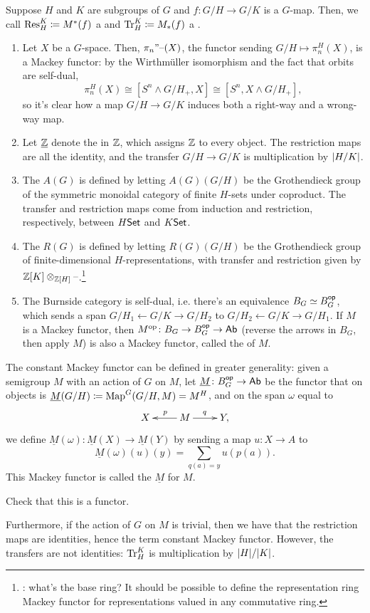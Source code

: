 Suppose $H$ and $K$ are subgroups of $G$ and $f\colon G/H\to G/K$ is a $G$-map. Then, we call $\operatorname{Res}_H^K\coloneqq
M^*(f)$ a  and $\operatorname{Tr}_H^K\coloneqq M_*(f)$ a .
\begin{exm}\hfill
\label{Mackeyexm}
\begin{enumerate}
	\item Let $X$ be a $G$-space. Then, $\pi_n"\text{--}(X)$, the functor sending $G/H\mapsto\pi_n^H(X)$, is a Mackey
	functor: by the Wirthmüller isomorphism and the fact that orbits are self-dual,
	\[\pi_n^H(X)\cong [S^n\wedge G/H_+, X]\cong [S^n, X\wedge G/H_+],\]
	so it's clear how a map $G/H\to G/K$ induces both a right-way and a wrong-way map.
	\item Let $\underline{\mathbb Z}$ denote the  in $\mathbb Z$, which assigns $\mathbb Z$ to every object.
	The restriction maps are all the identity, and the transfer $G/H\to G/K$ is multiplication by $\lvert H/K\rvert$.
	\item The  $A(G)$ is defined by letting $A(G)(G/H)$ be the Grothendieck group of
	the symmetric monoidal category of finite $H$-sets under coproduct. The transfer and restriction maps come from
	induction and restriction, respectively, between $H\mathsf{Set}$ and $K\mathsf{Set}$.
	\item The  $R(G)$ is defined by letting $R(G)(G/H)$ be the Grothendieck
	group of finite-dimensional $H$-representations, with transfer and restriction given by
	$\mathbb Z[K]\otimes_{\mathbb Z[H]}\text{--}$.\footnote{\TODO: what's the base ring? It should be possible to define the
	representation ring Mackey functor for representations valued in any commutative ring.}
	\item The Burnside category is self-dual, i.e. there's an equivalence $B_G\simeq B_G^{\mathsf{op}}$, which sends a span
	$G/H_1\gets G/K\to G/H_2$ to $G/H_2\gets G/K\to G/H_1$. If $M$ is a Mackey functor, then $M^{\mathrm{op}}\colon B_G\to
	B_G^{\mathsf{op}}\to\mathsf{Ab}$ (reverse the arrows in $B_G$, then apply $M$) is also a Mackey functor, called the
	 of $M$.
	\qedhere
\end{enumerate}
\end{exm}
\begin{exm}
The constant Mackey functor can be defined in greater generality: given a semigroup $M$ with an action of $G$ on
$M$, let $\underline M\colon B_G^{\mathsf{op}}\to\mathsf{Ab}$ be the functor that on objects is $\underline M(G/H)\coloneqq
\operatorname{Map}^G(G/H,M) = M^H$, and on the span $\omega$ equal to
	\[\xymatrix{
		X & M\ar[l]_p\ar[r]^q & Y,
	}\]
we define $\underline M(\omega)\colon \underline M(X) \to \underline M(Y)$ by sending a map $u\colon X \to A$ to
\[\underline M(\omega)(u)(y) = \sum_{q(a) = y} u(p(a)).\]
This Mackey functor is called the  $\underline M$ for $M$.
\end{exm}
\begin{ex}
Check that this is a functor.
\end{ex}
Furthermore, if the action of $G$ on $M$ is trivial, then we have that the restriction maps are identities, hence
the term constant Mackey functor. However, the transfers are not identities: $\operatorname{Tr}_H^K$ is multiplication by $\lvert H\rvert/\lvert K\rvert$.

